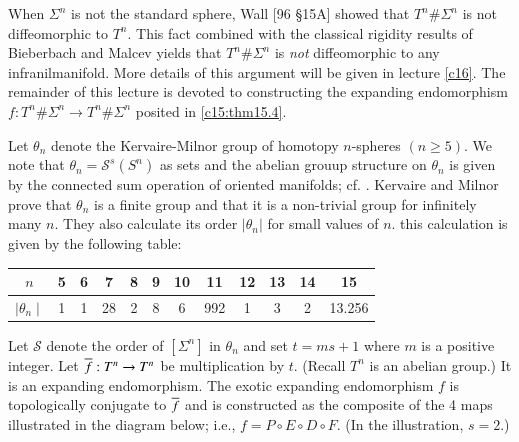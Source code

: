 When $\Sigma^n$ is not the standard sphere, Wall [96 \S 15A] showed
that $T^n \# \Sigma^n$ is not diffeomorphic to $T^n$. This fact
combined with the classical rigidity results of Bieberbach
\cite{6}\pageoriginale and Malcev \cite{70} yields that $T^n \#
\Sigma^n$ is \textit{not} diffeomorphic to any infranilmanifold. More
details of this argument will be given in lecture \ref{c16}. The
remainder of this lecture is devoted to constructing the expanding
endomorphism $f: T^n \# \Sigma^n \to T^n \# \Sigma^n$ posited in
\ref{c15:thm15.4}.

Let $\theta_n$ denote the Kervaire-Milnor group of homotopy
$n$-spheres $(n \geq 5)$. We note that $\theta_n = \mathcal{S}^s
(S^n)$ as sets and the abelian grouup structure on $\theta_n$ is given
by the connected sum operation of oriented manifolds;
cf. \cite{65}. Kervaire and Milnor prove that $\theta_n$ is a finite
group and that it is a non-trivial group for infinitely many $n$. They
also calculate its order $|\theta_n|$ for small values of $n$. this
calculation is given by the following table:

\medskip
\begin{tabular}{|c|ccccccccccc|}
\hline
$n$ & 5 & 6 & 7 & 8 & 9 & 10 &  11& 12 & 13 & 14 & 15\\
\hline
$\mid \theta_n \mid$ & 1 & 1 & 28 & 2 & 8 & 6 & 992 & 1 & 3 & 2 &
13.256\\
\hline
\end{tabular}
\medskip

Let $\mathcal{S}$ denote the order of $[\Sigma^n]$ in $\theta_n$ and
set $t= ms + 1$ where $m$ is a  positive integer. Let
$\overline{f}: T^n \to T^n$ be multiplication by $t$. (Recall $T^n$ is an
abelian group.) It is an expanding endomorphism. The exotic expanding
endomorphism $f$ is topologically conjugate to $\overline{f}$ and is
constructed as the composite of the 4 maps illustrated in the diagram
below; i.e., $f= P \circ E \circ D \circ F$. (In the illustration, $s=2$.)

\begin{figure}[H]
\end{figure}

